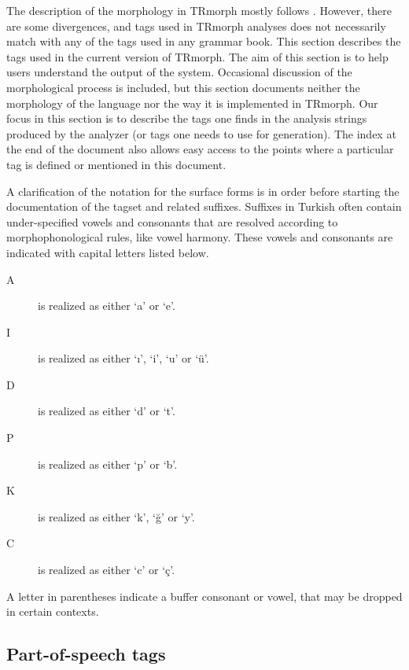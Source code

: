 \documentclass[twocolumn]{article}
\begin{document}
The description of the morphology in TRmorph mostly follows
\cite{goksel2005}. However, there are some divergences, and tags used
in TRmorph analyses does not necessarily match with any of the tags
used in any grammar book. This section describes the tags used in the
current version of TRmorph.  The aim of this section is to help users
understand the output of the system. Occasional discussion of the
morphological process is included, but this section documents neither
the morphology of the language nor the way it is implemented in
TRmorph.  Our focus in this section is to describe the tags one finds
in the analysis strings produced by the analyzer (or tags one
needs to use for generation).  The index at the end of the document
also allows easy access to the points where a particular tag is
defined or mentioned in this document.

A clarification of the notation for the surface forms is in order
before starting the documentation of the tagset and related suffixes.
Suffixes in Turkish often contain under-specified vowels and
consonants that are resolved according to morphophonological rules,
like vowel harmony. These vowels and consonants are indicated with
capital letters listed below.

\begin{description}
\item[A] is realized as either `a' or  `e'.
\item[I] is realized as either `ı', `i', `u' or  `ü'.
\item[D] is realized as either `d' or  `t'.
\item[P] is realized as either `p' or  `b'.
\item[K] is realized as either `k', `ğ' or  `y'.
\item[C] is realized as either `c' or  `ç'.
\end{description}

A letter in parentheses indicate a buffer consonant or vowel, that may
be dropped in certain contexts.

\subsection{Part-of-speech tags}
\end{document}
